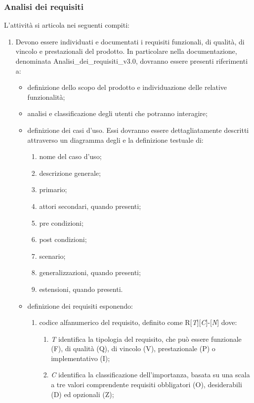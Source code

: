\subsubsection{Analisi dei requisiti}
L'attività si articola nei seguenti compiti:
\begin{enumerate}
    \item Devono essere individuati e documentati i requisiti funzionali, di qualità, di vincolo e prestazionali del prodotto. In particolare nella documentazione, denominata Analisi\_dei\_requisiti\_v3.0, dovranno essere presenti riferimenti a:
    \begin{itemize}
        \item definizione dello scopo del prodotto e individuazione delle relative funzionalità;
        \item analisi e classificazione degli utenti che potranno interagire;
        \item definizione dei casi d'uso. Essi dovranno essere dettagliatamente descritti attraverso un diagramma  degli  e la definizione testuale di:
        \begin{enumerate}
            \item nome del caso d'uso;
            \item descrizione generale;
            \item {} primario;
            \item attori secondari, quando presenti;
            \item pre condizioni;
            \item post condizioni;
            \item scenario;
            \item generalizzazioni, quando presenti;
            \item estensioni, quando presenti.
        \end{enumerate}
    \item definizione dei requisiti esponendo:
    \begin{enumerate}
        \item codice alfanumerico del requisito, definito come R[\textit{T}][\textit{C}]-[\textit{N}] dove:
        \begin{enumerate}
            \item \textit{T} identifica la tipologia del requisito, che può essere funzionale (F), di qualità (Q), di vincolo (V), prestazionale (P) o implementativo (I);
            \item \textit{C} identifica la classificazione dell'importanza, basata su una scala a tre valori comprendente requisiti obbligatori (O), desiderabili (D) ed opzionali (Z);

\end{enumerate}
\end{enumerate}
\end{itemize}
\end{enumerate}
